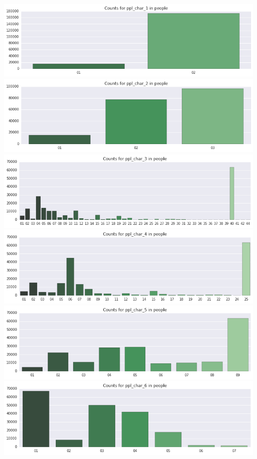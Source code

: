 \documentclass[]{report}
\begin{document}
\includegraphics{assets/img/BarPlots_4_0.png}
\includegraphics{assets/img/BarPlots_5_0.png}
\includegraphics{assets/img/BarPlots_5_1.png}
\includegraphics{assets/img/BarPlots_5_2.png}
\includegraphics{assets/img/BarPlots_5_3.png}
\includegraphics{assets/img/BarPlots_5_4.png}
\end{document}
